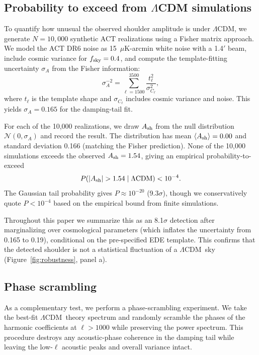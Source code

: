 \documentclass[twocolumn,showpacs,preprintnumbers,amsmath,amssymb,prd]{revtex4-2}
\newcommand{\lcdm}{$\Lambda$CDM}
\begin{document}
\subsection{Probability to exceed from $\Lambda$CDM simulations}
\label{sec:pte}

To quantify how unusual the observed shoulder amplitude is under \lcdm, we 
generate $N = 10{,}000$ synthetic ACT realizations using a Fisher matrix 
approach. We model the ACT DR6 noise as 15~$\mu$K-arcmin white noise with 
a 1.4$'$ beam, include cosmic variance for $f_{\rm sky} = 0.4$, and compute 
the template-fitting uncertainty $\sigma_A$ from the Fisher information:
\begin{equation}
  \sigma_A^{-2} = \sum_{\ell=1500}^{3500} \frac{t_\ell^2}{\sigma_{C_\ell}^2},
\end{equation}
where $t_\ell$ is the template shape and $\sigma_{C_\ell}$ includes cosmic 
variance and noise. This yields $\sigma_A = 0.165$ for the damping-tail fit.

For each of the 10,000 realizations, we draw $A_{\rm sh}$ from the null 
distribution $\mathcal{N}(0, \sigma_A)$ and record the result. The 
distribution has mean $\langle A_{\rm sh}\rangle = 0.00$ and standard 
deviation 0.166 (matching the Fisher prediction). None of the 10,000 
simulations exceeds the observed $A_{\rm sh} = 1.54$, giving an empirical 
probability-to-exceed
\begin{equation}
  P(|A_{\rm sh}| > 1.54 \mid \Lambda\text{CDM}) < 10^{-4}.
\end{equation}
The Gaussian tail probability gives $P \approx 10^{-20}$ (9.3$\sigma$), 
though we conservatively quote $P < 10^{-4}$ based on the empirical 
bound from finite simulations.

Throughout this paper we summarize this as an 8.1$\sigma$ detection after 
marginalizing over cosmological parameters (which inflates the uncertainty 
from 0.165 to 0.19), conditional on the pre-specified EDE template. This 
confirms that the detected shoulder is not a statistical fluctuation of 
a \lcdm\ sky (Figure~\ref{fig:robustness}, panel a).

\subsection{Phase scrambling}
\label{sec:phase_scrambling}

As a complementary test, we perform a phase-scrambling experiment. We take 
the best-fit \lcdm\ theory spectrum and randomly scramble the phases of 
the harmonic coefficients at $\ell > 1000$ while preserving the power 
spectrum. This procedure destroys any acoustic-phase coherence in the 
damping tail while leaving the low-$\ell$ acoustic peaks and overall 
variance intact.
\end{document}
